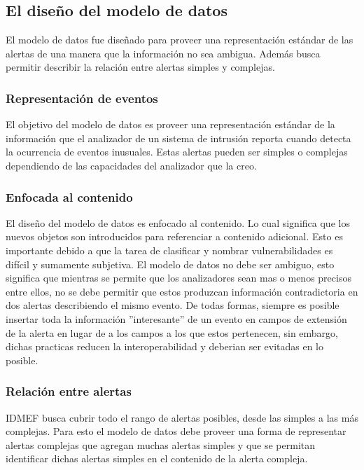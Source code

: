 \subsection{El diseño del modelo de datos}

El modelo de datos fue diseñado para proveer una representación estándar de las 
alertas de una manera que la información no sea ambigua. Además busca permitir 
describir la relación entre alertas simples y complejas.

\subsubsection{Representación de eventos}
El objetivo del modelo de datos es proveer una representación estándar de la 
información que el analizador de un sistema de intrusión reporta cuando detecta 
la ocurrencia de eventos inusuales. Estas alertas pueden ser simples o complejas 
dependiendo de las capacidades del analizador que la creo.

\subsubsection{Enfocada al contenido}

El diseño del modelo de datos es enfocado al contenido. Lo cual significa que 
los nuevos objetos son introducidos para referenciar a contenido adicional. Esto 
es importante debido a que la tarea de clasificar y nombrar vulnerabilidades es difícil y sumamente subjetiva. El modelo de datos no debe ser 
ambiguo, esto significa que mientras se permite que los analizadores sean mas o 
menos precisos entre ellos, no se debe permitir que estos produzcan información 
contradictoria en dos alertas describiendo el mismo evento. De todas formas, 
siempre es posible insertar toda la información ''interesante'' de un evento en 
campos de extensión de la alerta en lugar de a los campos a los que estos 
pertenecen, sin embargo, dichas practicas reducen la interoperabilidad y 
deberian ser evitadas en lo posible.

\subsubsection{Relación entre alertas}

IDMEF busca cubrir todo el rango de alertas posibles, desde las simples a las 
más complejas. Para esto el modelo de datos debe proveer una forma de 
representar alertas complejas que agregan muchas alertas simples y que se 
permitan identificar dichas alertas simples en el contenido de la alerta 
compleja.

